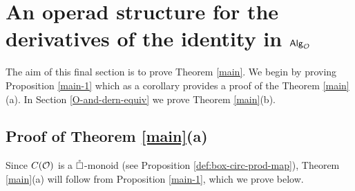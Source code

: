 \section{An operad structure for the derivatives of the identity in ${\mathsf{Alg}_{\mathcal{O}}}$}\label{sec:algO-derv}

The aim of this final section is to prove Theorem \ref{main}. We begin by proving Proposition \ref{main-1} which as a corollary provides a proof of the Theorem \ref{main}(a). In Section \ref{O-and-dern-equiv} we prove Theorem \ref{main}(b).

\subsection{Proof of Theorem \ref{main}(a)} \label{sec:1a} Since $C(\mathcal{O})$ is a $\mathring{\square}$-monoid (see Proposition \ref{def:box-circ-prod-map}), Theorem \ref{main}(a) will follow from Proposition \ref{main-1}, which we prove below. 

